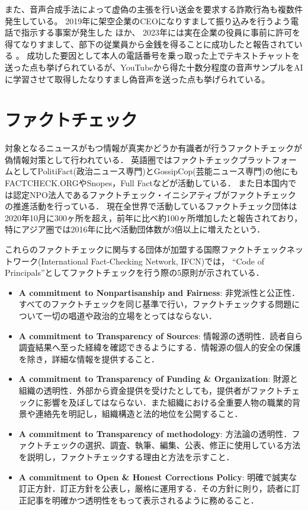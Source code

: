 また、音声合成手法によって虚偽の主張を行い送金を要求する詐欺行為も複数件発生している。
2019年に架空企業のCEOになりすまして振り込みを行うよう電話で指示する事案が発生した \cite{Stupp_2019}ほか、
2023年には実在企業の役員に事前に許可を得てなりすまして、部下の従業員から金銭を得ることに成功したと報告されている \cite{Bunn_2023}。
成功した要因として本人の電話番号を乗っ取った上でテキストチャットを送った点も挙げられているが、YouTubeから得た十数分程度の音声サンプルをAIに学習させて取得したなりすまし偽音声を送った点も挙げられている。


\section{ファクトチェック}
対象となるニュースがもつ情報が真実かどうか有識者が行うファクトチェックが偽情報対策として行われている．
英語圏ではファクトチェックプラットフォームとしてPolitiFact(政治ニュース専門)とGossipCop(芸能ニュース専門)の他にもFACTCHECK.ORGやSnopes，Full Factなどが活動している．
また日本国内では認定NPO法人であるファクトチェック・イニシアティブがファクトチェックの推進活動を行っている．
現在全世界で活動しているファクトチェック団体は2020年10月に300ヶ所を超え，前年に比べ約100ヶ所増加したと報告されており，
特にアジア圏では2016年に比べ活動団体数が3倍以上に増えたという\cite{stencel_luther_2020}．

これらのファクトチェックに関与する団体が加盟する国際ファクトチェックネットワーク(International Fact-Checking Network, IFCN)では，
``Code of Principals''としてファクトチェックを行う際の5原則が示されている\cite{IFCN,fij}．

\begin{itemize}
    \item \textbf{A commitment to Nonpartisanship and Fairness}: 非党派性と公正性．すべてのファクトチェックを同じ基準で行い，ファクトチェックする問題について一切の唱道や政治的立場をとってはならない．
    \item \textbf{A commitment to Transparency of Sources}: 情報源の透明性．読者自ら調査結果へ至った経緯を確認できるようにする．情報源の個人的安全の保護を除き，詳細な情報を提供すること．
    \item \textbf{A commitment to Transparency of Funding \& Organization}: 財源と組織の透明性．外部から資金提供を受けたとしても，提供者がファクトチェックに影響を及ぼしてはならない．また組織における全重要人物の職業的背景や連絡先を明記し，組織構造と法的地位を公開すること．
    \item \textbf{A commitment to Transparency of methodology}: 方法論の透明性．ファクトチェックの選択、調査、執筆、編集、公表、修正に使用している方法を説明し，ファクトチェックする理由と方法を示すこと．
    \item \textbf{A commitment to Open \& Honest Corrections Policy}: 明確で誠実な訂正方針．訂正方針を公表し，厳格に運用する．その方針に則り，読者に訂正記事を明確かつ透明性をもって表示されるように務めること．
\end{itemize}

